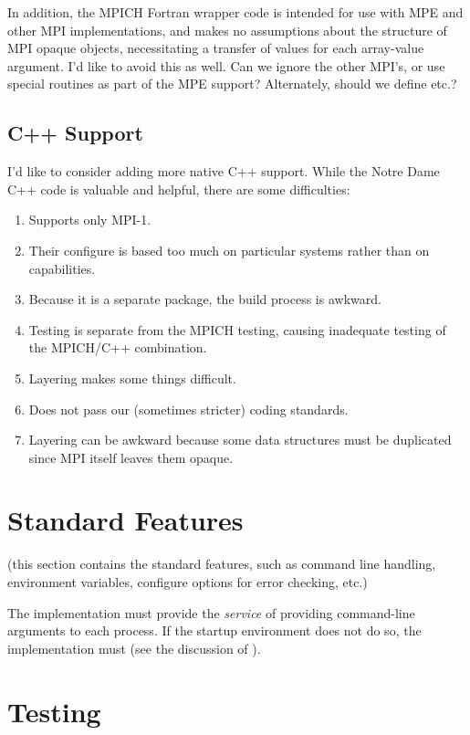 \documentclass{article}
\begin{document}
In addition, the MPICH Fortran wrapper code is intended for use with MPE and
other MPI implementations, and makes no assumptions about the structure of
MPI opaque objects, necessitating a transfer of values for each array-value
argument.  I'd like to avoid this as well.  Can we ignore the other MPI's, or
use special routines as part of the MPE support?  Alternately, should we
define  etc.?

\subsection{C++ Support}

I'd like to consider adding more native C++ support.  While the Notre
Dame C++ code is valuable and helpful, there are some difficulties:
\begin{enumerate}
\item Supports only MPI-1.
\item Their configure is based too much on particular systems rather than on
capabilities. 
\item Because it is a separate package, the build process is awkward.
\item Testing is separate from the MPICH testing, causing inadequate
testing of the MPICH/C++ combination.
\item Layering makes some things difficult. 
\item Does not pass our (sometimes stricter) coding standards.
\item Layering can be awkward because some data structures must be
duplicated since MPI itself leaves them opaque. 
\end{enumerate}

\section{Standard Features}
(this section contains the standard features, such as command line
handling, environment variables, configure options for error checking,
etc.)

The implementation must provide the \emph{service} of providing
command-line arguments to each process.  If the startup environment
does not do so, the implementation must (see the discussion of
).  

\section{Testing}
\end{document}
